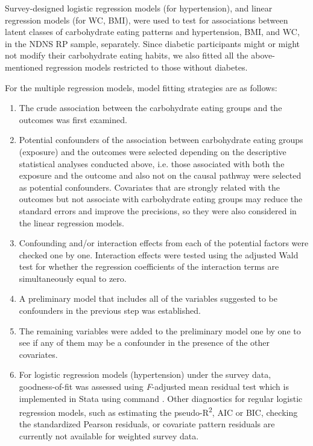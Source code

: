 

Survey-designed logistic regression models (for hypertension), and linear regression models (for WC, BMI), were used to test for associations between latent classes of carbohydrate eating patterns and hypertension, BMI, and WC, in the NDNS RP sample, separately. Since diabetic participants might or might not modify their carbohydrate eating habits, we also fitted all the above-mentioned regression models restricted to those without diabetes.

For the multiple regression models, model fitting strategies are as follows: 

\begin{enumerate}
	\item The crude association between the carbohydrate eating groups and the outcomes was first examined. 
	\item Potential confounders of the association between carbohydrate eating groups (exposure) and the outcomes were selected depending on the descriptive statistical analyses conducted above, i.e. those associated with both the exposure and the outcome and also not on the causal pathway were selected as potential confounders. Covariates that are strongly related with the outcomes but not associate with carbohydrate eating groups may reduce the standard errors and improve the precisions, so they were also considered in the linear regression models. 
	\item Confounding and/or interaction effects from each of the potential factors were checked one by one. Interaction effects were tested using the adjusted Wald test for whether the regression coefficients of the interaction terms are simultaneously equal to zero.  
	\item A preliminary model that includes all of the variables suggested to be confounders in the previous step was established. 
	\item The remaining variables were added to the preliminary model one by one to see if any of them may be a confounder in the presence of the other covariates. 
	\item For logistic regression models (hypertension) under the survey data, goodness-of-fit was assessed using \textit{F}-adjusted mean residual test \parencite{archer2001goodness,archer2007goodness} which is implemented in Stata using command  \parencite{archer2006goodness}. Other diagnostics for regular logistic regression models, such as estimating the pseudo-R\textsuperscript{2},  AIC or BIC, checking the standardized Pearson residuals, or covariate pattern residuals are currently not available for weighted survey data. 

\end{enumerate}
